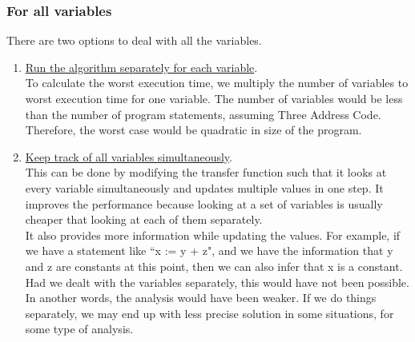 \subsubsection{For all variables}
There are two options to deal with all the variables.
\begin{enumerate}
    \item \underline{Run the algorithm separately for each variable}.\\
    To calculate the worst execution time, we multiply the number of variables to worst execution time for one variable. The number of variables would be less than the number of program statements, assuming Three Address Code.
    Therefore, the worst case would be quadratic in size of the program.
    \item \underline{Keep track of all variables simultaneously}.\\
    This can be done by modifying the transfer function such that it looks at every variable simultaneously and updates multiple values in one step. It improves the performance because looking at a set of variables is usually cheaper that looking at each of them separately.\\
    It also provides more information while updating the values. For example, if we have a statement like ``x := y + z", and we have the information that y and z are constants at this point, then we can also infer that x is a constant. Had we dealt with the variables separately, this would have not been possible. In another words, the analysis would have been weaker. If we do things separately, we may end up with less precise solution in some situations, for some type of analysis.
\end{enumerate}

